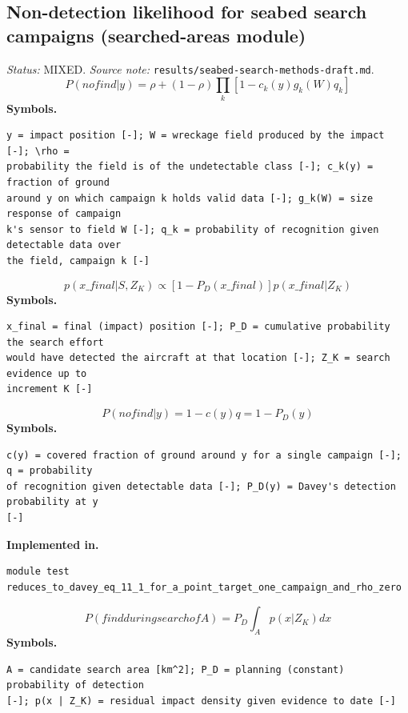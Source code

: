 \documentclass[11pt,a4paper]{article}
\begin{document}
\subsection{Non-detection likelihood for seabed search campaigns (searched-areas module)}
\noindent\textit{Status:} MIXED. \textit{Source note:} \texttt{results/seabed-search-methods-draft.md}.
\medskip
\begin{equation}
P(no find | y) = \rho + (1 - \rho) \prod_k [1 - c_k(y) g_k(W) q_k]
\end{equation}
\noindent\textbf{Symbols.}
\begin{verbatim}
y = impact position [-]; W = wreckage field produced by the impact [-]; \rho =
probability the field is of the undetectable class [-]; c_k(y) = fraction of ground
around y on which campaign k holds valid data [-]; g_k(W) = size response of campaign
k's sensor to field W [-]; q_k = probability of recognition given detectable data over
the field, campaign k [-]
\end{verbatim}
\medskip
\begin{equation}
p(x\_final | S, Z_K) \propto [1 - P_D(x\_final)] p(x\_final | Z_K)
\end{equation}
\noindent\textbf{Symbols.}
\begin{verbatim}
x_final = final (impact) position [-]; P_D = cumulative probability the search effort
would have detected the aircraft at that location [-]; Z_K = search evidence up to
increment K [-]
\end{verbatim}
\medskip
\begin{equation}
P(no find | y) = 1 - c(y) q = 1 - P_D(y)
\end{equation}
\noindent\textbf{Symbols.}
\begin{verbatim}
c(y) = covered fraction of ground around y for a single campaign [-]; q = probability
of recognition given detectable data [-]; P_D(y) = Davey's detection probability at y
[-]
\end{verbatim}
\noindent\textbf{Implemented in.}
\begin{verbatim}
module test reduces_to_davey_eq_11_1_for_a_point_target_one_campaign_and_rho_zero
\end{verbatim}
\medskip
\begin{equation}
P(find during search of A) = P_D \int_A p(x | Z_K) dx
\end{equation}
\noindent\textbf{Symbols.}
\begin{verbatim}
A = candidate search area [km^2]; P_D = planning (constant) probability of detection
[-]; p(x | Z_K) = residual impact density given evidence to date [-]
\end{verbatim}
\medskip
\end{document}

